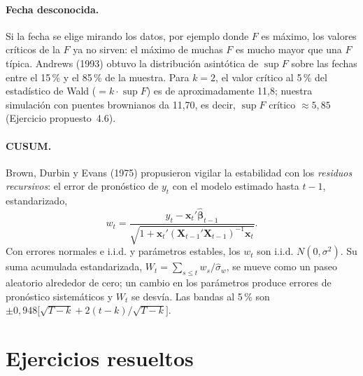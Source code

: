 \paragraph{Fecha desconocida.} Si la fecha se elige mirando los datos, por ejemplo donde $F$ es máximo, los
valores críticos de la $F$ ya no sirven: el máximo de muchas $F$ es mucho mayor que una $F$ típica. Andrews
(1993) obtuvo la distribución asintótica de $\sup F$ sobre las fechas entre el 15\,\% y el 85\,\% de la
muestra. Para $k=2$, el valor crítico al 5\,\% del estadístico de Wald ($=k\cdot\sup F$) es de
aproximadamente 11,8; nuestra simulación con puentes brownianos da 11,70, es decir, $\sup F$ crítico
$\approx5{,}85$ (Ejercicio propuesto~4.6).

\paragraph{CUSUM.} Brown, Durbin y Evans (1975) propusieron vigilar la estabilidad con los \emph{residuos
recursivos}: el error de pronóstico de $y_t$ con el modelo estimado hasta $t-1$, estandarizado,
\[
  w_t=\frac{y_t-\bm x_t'\hat{\bm\beta}_{t-1}}{\sqrt{1+\bm x_t'(\bm X_{t-1}'\bm X_{t-1})^{-1}\bm x_t}} .
\]
Con errores normales e i.i.d. y parámetros estables, los $w_t$ son i.i.d. $N(0,\sigma^2)$. Su suma acumulada
estandarizada, $W_t=\sum_{s\le t}w_s/\hat\sigma_w$, se mueve como un paseo aleatorio alrededor de cero; un
cambio en los parámetros produce errores de pronóstico sistemáticos y $W_t$ se desvía. Las bandas al 5\,\%
son $\pm0{,}948\bigl[\sqrt{T-k}+2(t-k)/\sqrt{T-k}\bigr]$.

\section{Ejercicios resueltos}

